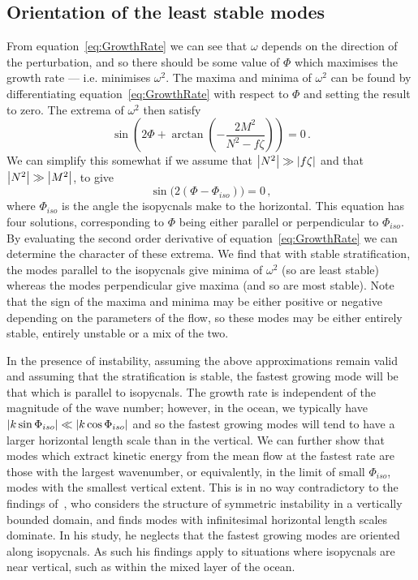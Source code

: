     \subsection{Orientation of the least stable modes}
    From equation~\ref{eq:GrowthRate} we can see that $\omega$ depends on the direction of the perturbation, and so there should be some value of $\Phi$ which maximises the growth rate --- i.e. minimises $\omega^2$. The maxima and minima of $\omega^2$ can be found by differentiating equation~\ref{eq:GrowthRate} with respect to $\Phi$ and setting the result to zero. The extrema of $\omega^2$ then satisfy
    \begin{equation}
        \sin(2 \Phi + \arctan(-\frac{2M^2}{N^2 - f \zeta})) = 0 \, .
    \end{equation}
    We can simplify this somewhat if we assume that $\abs{N^2} \gg \abs{f \zeta}$ and that $\abs{N^2} \gg \abs{M^2}$, to give
    \begin{equation}
        \label{eq:UnstableDirections}
        \sin\big(2(\Phi - \Phi_{iso})\big) = 0 \, ,
    \end{equation}
    where $\Phi_{iso}$ is the angle the isopycnals make to the horizontal. This equation has four solutions, corresponding to $\Phi$ being either parallel or perpendicular to $\Phi_{iso}$. By evaluating the second order derivative of equation~\ref{eq:GrowthRate} we can determine the character of these extrema. We find that with stable stratification, the modes parallel to the isopycnals give minima of $\omega^2$ (so are least stable) whereas the modes perpendicular give maxima (and so are most stable). Note that the sign of the maxima and minima may be either positive or negative depending on the parameters of the flow, so these modes may be either entirely stable, entirely unstable or a mix of the two.
    
    In the presence of instability, assuming the above approximations remain valid and assuming that the stratification is stable, the fastest growing mode will be that which is parallel to isopycnals. The growth rate is independent of the magnitude of the wave number; however, in the ocean, we typically have $\abs{k \sin\Phi_{iso}} \ll \abs{k \cos\Phi_{iso}}$ and so the fastest growing modes will tend to have a larger horizontal length scale than in the vertical. We can further show that modes which extract kinetic energy from the mean flow at the fastest rate are those with the largest wavenumber, or equivalently, in the limit of small $\Phi_{iso}$, modes with the smallest vertical extent. This is in no way contradictory to the findings of~\citet{Stone1966}, who considers the structure of symmetric instability in a vertically bounded domain, and finds modes with infinitesimal horizontal length scales dominate. In his study, he neglects that the fastest growing modes are oriented along isopycnals. As such his findings apply to situations where isopycnals are near vertical, such as within the mixed layer of the ocean.

